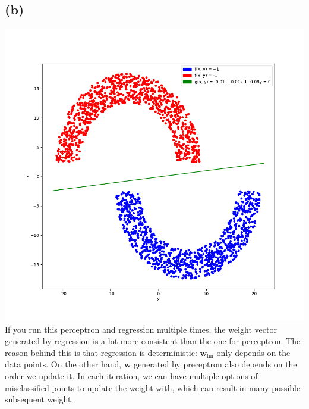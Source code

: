 \documentclass{article}
\begin{document}
	\subsection*{(b)}
		\includegraphics[scale=0.38]{p3.1b.png}\\
		If you run this perceptron and regression multiple times, the weight vector generated by regression is a lot more consistent than the one for perceptron. The reason behind this is that regression is deterministic: $\mathbf w_\text{lin}$ only depends on the data points. On the other hand, $\mathbf w$ generated by preceptron also depends on the order we update it. In each iteration, we can have multiple options of misclassified points to update the weight with, which can result in many possible subsequent weight.
		
\end{document}
